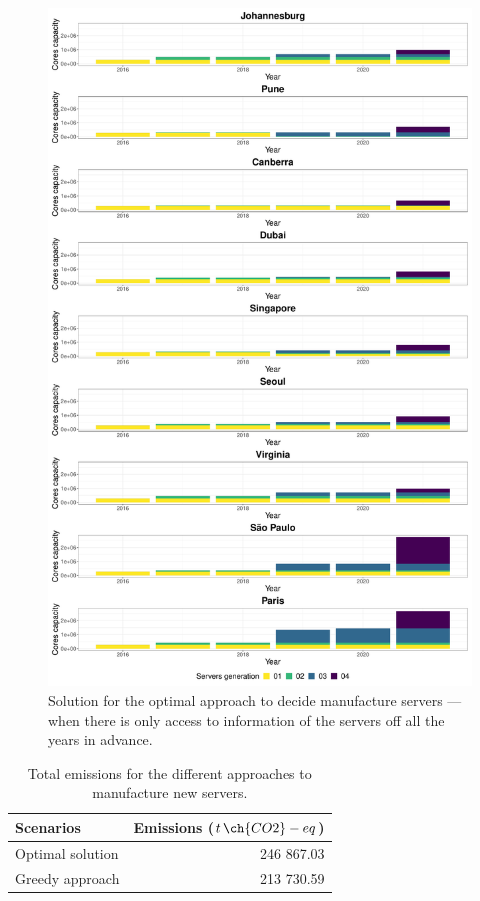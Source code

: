 \begin{figure}[ht]
\centering
  \includegraphics[width=\linewidth]{images/dc_evolution_optimal.pdf}
  \caption{Solution for the optimal approach to decide manufacture servers --- when there is only access to information of the servers off all the years in advance.}
  \label{fig:dc_evolution_optimal}
\end{figure}


\begin{table}[!ht]
  
\caption{Total emissions for the different approaches to manufacture new servers.}\label{tab:emissions_sizing} \centering
\begin{tabular}{|l|r|}
  \hline
  \textbf{Scenarios} & \textbf{Emissions ($t\,\ch{CO2}-eq$)}   \\
  \hline  
   Optimal solution  &   246 867.03 \\  
  \hline
   Greedy approach                   &   213 730.59  \\
  \hline

\end{tabular}
\end{table}


